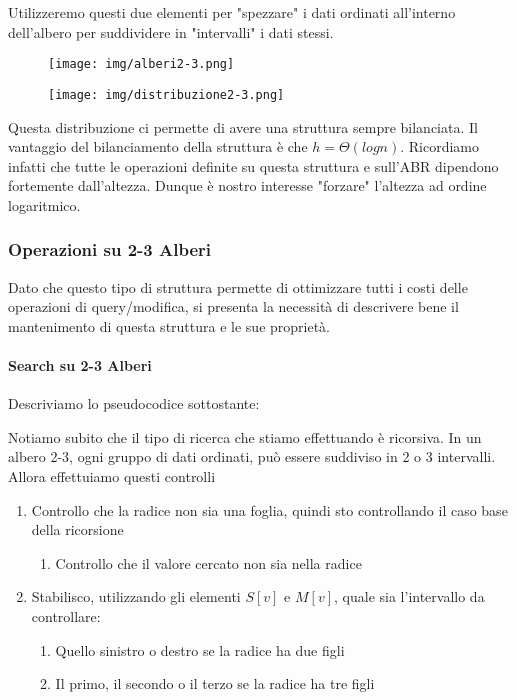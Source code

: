 \documentclass{article}
\begin{document}
Utilizzeremo questi due elementi per "spezzare" i dati ordinati all'interno dell'albero per suddividere in "intervalli" i dati stessi.

\begin{figure}[htbp]
        \center
        \texttt{[image: img/alberi2-3.png]}
\end{figure}

\begin{figure}[htbp]
        \center
        \texttt{[image: img/distribuzione2-3.png]}
\end{figure}

Questa distribuzione ci permette di avere una struttura sempre bilanciata. Il vantaggio del bilanciamento della struttura è che $h=\Theta(log n)$. Ricordiamo infatti che tutte le operazioni definite su questa struttura e sull'ABR dipendono fortemente dall'altezza. Dunque è nostro interesse "forzare" l'altezza ad ordine logaritmico.

\newpage

\subsubsection{Operazioni su 2-3 Alberi} Dato che questo tipo di struttura permette di ottimizzare tutti i costi delle operazioni di query/modifica, si presenta la necessità di descrivere bene il mantenimento di questa struttura e le sue proprietà.

\paragraph{Search su 2-3 Alberi} Descriviamo lo pseudocodice sottostante:

Notiamo subito che il tipo di ricerca che stiamo effettuando è ricorsiva.
In un albero 2-3, ogni gruppo di dati ordinati, può essere suddiviso in 2 o 3 intervalli.
Allora effettuiamo questi controlli

\begin{enumerate}
    \item Controllo che la radice non sia una foglia, quindi sto controllando il caso base della ricorsione
    \begin{enumerate}
        \item Controllo che il valore cercato non sia nella radice
    \end{enumerate}
    \item Stabilisco, utilizzando gli elementi $S[v]$ e $M[v]$, quale sia l'intervallo da controllare:
    \begin{enumerate}
        \item Quello sinistro o destro se la radice ha due figli
        \item Il primo, il secondo o il terzo se la radice ha tre figli
    \end{enumerate}
\end{enumerate}
\end{document}
